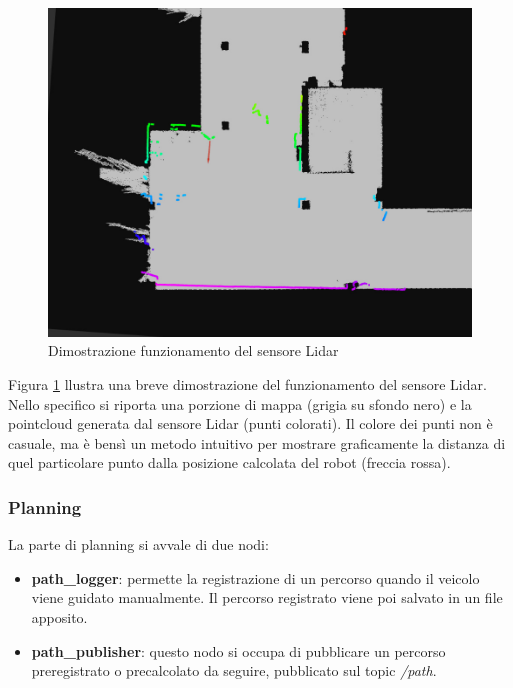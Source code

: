\begin{figure}[H]
  \centering
  \includegraphics[width=1\textwidth]{figures/lidar_map.png}
  \caption{Dimostrazione funzionamento del sensore Lidar}
  \label{funzionamento_particle_filter}
\end{figure}

\noindent Figura \ref{funzionamento_particle_filter} llustra una breve dimostrazione del funzionamento del sensore Lidar. Nello specifico si riporta una porzione di mappa (grigia su sfondo nero) e la pointcloud generata dal sensore Lidar (punti colorati). Il colore dei punti non è casuale, ma è bensì un metodo intuitivo per mostrare graficamente la distanza di quel particolare punto dalla posizione calcolata del robot (freccia rossa).

\subsubsection{Planning}
\noindent La parte di planning si avvale di due nodi:

\begin{itemize}
  \item \textbf{path\_logger}: permette la registrazione di un percorso quando il veicolo viene guidato manualmente. Il percorso registrato viene poi salvato in un file apposito.
  \item \textbf{path\_publisher}: questo nodo si occupa di pubblicare un percorso preregistrato o precalcolato da seguire, pubblicato sul topic \textit{/path}.  
\end{itemize}

